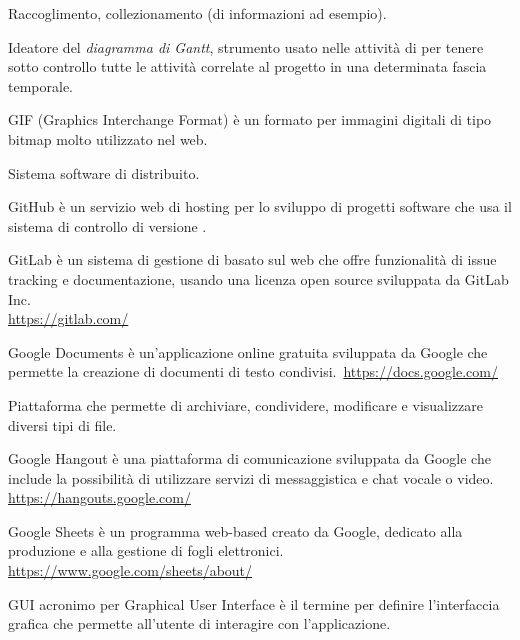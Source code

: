 Raccoglimento, collezionamento (di informazioni ad esempio).

Ideatore del \textit{diagramma di Gantt}, strumento usato nelle attività di  per tenere sotto controllo tutte le attività correlate al progetto in una determinata fascia temporale.

GIF (Graphics Interchange Format) è un formato per immagini digitali di tipo bitmap molto utilizzato nel web. 

Sistema software di  distribuito.

GitHub è un servizio web di hosting per lo sviluppo di progetti software che usa il sistema di controllo di versione .

GitLab è un sistema di gestione di   basato sul web che offre funzionalità di issue tracking e documentazione, usando una licenza open source sviluppata da GitLab Inc.\\
\url{https://gitlab.com/}

Google Documents è un'applicazione online gratuita sviluppata da Google che permette la creazione di documenti di testo condivisi.\
\url{https://docs.google.com/}

Piattaforma che permette di archiviare, condividere, modificare e visualizzare diversi tipi di file.

Google Hangout è una piattaforma di comunicazione sviluppata da Google che include la possibilità di utilizzare servizi di messaggistica e chat vocale o video.\\
\url{https://hangouts.google.com/}

Google Sheets è un programma web-based creato da Google, dedicato alla produzione e alla gestione di fogli elettronici.\\
\url{https://www.google.com/sheets/about/}

GUI acronimo per Graphical User Interface è il termine per definire l'interfaccia grafica che permette all'utente di interagire con l'applicazione.
\clearpage
